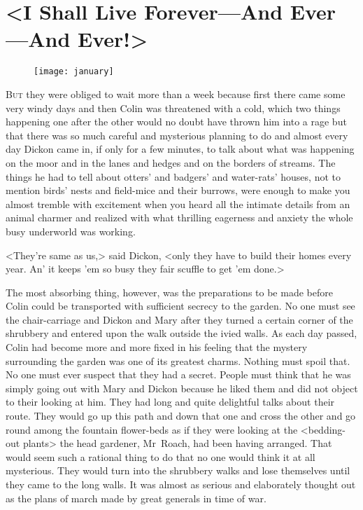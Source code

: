 \chapter{<I Shall Live Forever—And Ever—And Ever!>}
	
\begin{figure}[t!]
\centering
\texttt{[image: january]}
\end{figure}

	\lettrine[]{B}{ut} they were obliged to wait more than a week because first there came some very windy days and then Colin was threatened with a cold, which two things happening one after the other would no doubt have thrown him into a rage but that there was so much careful and mysterious planning to do and almost every day Dickon came in, if only for a few minutes, to talk about what was happening on the moor and in the lanes and hedges and on the borders of streams. The things he had to tell about otters' and badgers' and water-rats' houses, not to mention birds' nests and field-mice and their burrows, were enough to make you almost tremble with excitement when you heard all the intimate details from an animal charmer and realized with what thrilling eagerness and anxiety the whole busy underworld was working.

<They're same as us,> said Dickon, <only they have to build their homes every year. An' it keeps 'em so busy they fair scuffle to get 'em done.>

The most absorbing thing, however, was the preparations to be made before Colin could be transported with sufficient secrecy to the garden. No one must see the chair-carriage and Dickon and Mary after they turned a certain corner of the shrubbery and entered upon the walk outside the ivied walls. As each day passed, Colin had become more and more fixed in his feeling that the mystery surrounding the garden was one of its greatest charms. Nothing must spoil that. No one must ever suspect that they had a secret. People must think that he was simply going out with Mary and Dickon because he liked them and did not object to their looking at him. They had long and quite delightful talks about their route. They would go up this path and down that one and cross the other and go round among the fountain flower-beds as if they were looking at the <bedding-out plants> the head gardener, Mr~Roach, had been having arranged. That would seem such a rational thing to do that no one would think it at all mysterious. They would turn into the shrubbery walks and lose themselves until they came to the long walls. It was almost as serious and elaborately thought out as the plans of march made by great generals in time of war.

